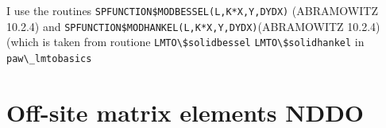 \documentclass[11pt,a4paper]{report}
\begin{document}






I use the routines \verb|SPFUNCTION$MODBESSEL(L,K*X,Y,DYDX)| (ABRAMOWITZ 10.2.4)
and \verb|SPFUNCTION$MODHANKEL(L,K*X,Y,DYDX)|(ABRAMOWITZ 10.2.4)
(which is taken from routione \verb|LMTO\$solidbessel| 
\verb|LMTO\$solidhankel| in \verb|paw\_lmtobasics|

\chapter{Off-site matrix elements NDDO}

\end{document}
